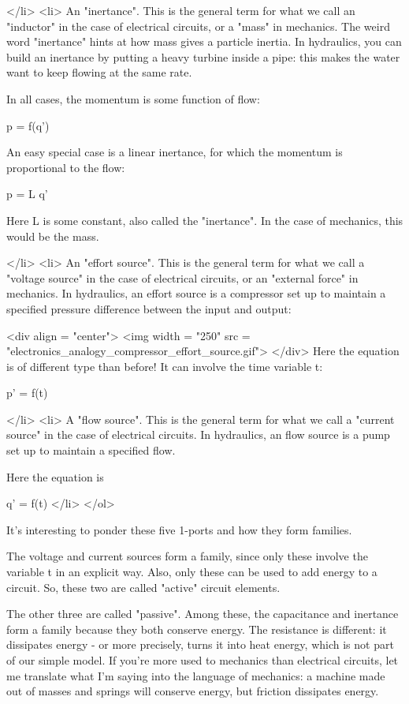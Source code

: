 </li>
<li> 
  An "inertance".  This is the general term for what we
  call an "inductor" in the case of electrical circuits, or
  a "mass" in mechanics.  The weird word
  "inertance" hints at how mass gives a particle inertia.
  In hydraulics, you can build an inertance by putting a heavy turbine
  inside a pipe: this makes the water want to keep flowing at the same
  rate.

  In all cases, the momentum is some function of flow:

  p = f(q')

  An easy special case is a linear inertance, for which the 
  momentum is proportional to the flow:

  p = L q'

  Here L is some constant, also called the "inertance".  In
  the case of mechanics, this would be the mass.

</li>
<li>
  An "effort source".  This is the general term for what we
  call a "voltage source" in the case of electrical
  circuits, or an "external force" in mechanics.  In 
  hydraulics, an effort source is a compressor set up to maintain a 
  specified pressure difference between the input and output:

<div align = "center">
<img width = "250" src = "electronics_analogy_compressor_effort_source.gif">
</div>
Here the
equation is of different type than before!  It can involve the time
variable t:

  p' = f(t)
  
</li>
<li>
  A "flow source".  This is the general term for what we
  call a "current source" in the case of electrical
  circuits.  In hydraulics, an flow source is a pump set up to
  maintain a specified flow.

Here the equation is

  q' = f(t)
</li>
</ol>

It's interesting to ponder these five 1-ports and how they form
families.

The voltage and current sources form a family, since only these
involve the variable t in an explicit way.  Also, only these can be
used to add energy to a circuit.  So, these two are called
"active" circuit elements.

The other three are called "passive".  Among these, the
capacitance and inertance form a family because they both conserve
energy.  The resistance is different: it dissipates energy - or more
precisely, turns it into heat energy, which is not part of our simple
model.  If you're more used to mechanics than electrical circuits, let
me translate what I'm saying into the language of mechanics: a machine
made out of masses and springs will conserve energy, but friction
dissipates energy.

